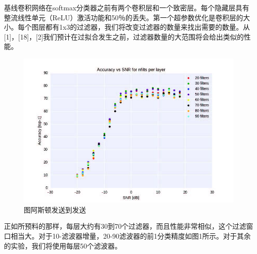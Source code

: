 基线卷积网络在softmax分类器之前有两个卷积层和一个致密层。每个隐藏层具有整流线性单元（ReLU）激活功能和50％的丢失。第一个超参数优化是卷积层的大小。每个图层都有1x3的过滤器，我们将改变过滤器的数量来找出需要的数量。从[1]，[18]，[2]我们预计在过拟合发生之前，过滤器数量的大范围将会给出类似的性能。\par
\begin{figure}[!h]
	\centering
	\includegraphics[scale=1]{figures/chapter_5/fig1}
	\caption{图阿斯顿发送到发送}\label{fig_5_1}
\end{figure}
正如所预料的那样，每层大约有30到70个过滤器，而且性能非常相似，这个过滤窗口相当大。对于10-滤波器增量，20-90滤波器的前1分类精度如图1所示。对于其余的实验，我们将使用每层50个滤波器。\par

